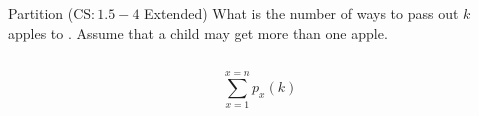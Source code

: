 
\begin{frame}{}
  \begin{exampleblock}{Partition ($\text{CS}: 1.5-4$ Extended)}
    What is the number of ways to pass out $k$  apples to . 
    Assume that a child may get more than one apple.
  \end{exampleblock}

  \pause
  \begin{columns}
  \end{columns}

  \pause
  \vspace{0.80cm}
  \centerline{}

  \pause
  \[
    \sum_{x=1}^{x=n} p_{x}(k)
  \]
\end{frame}
